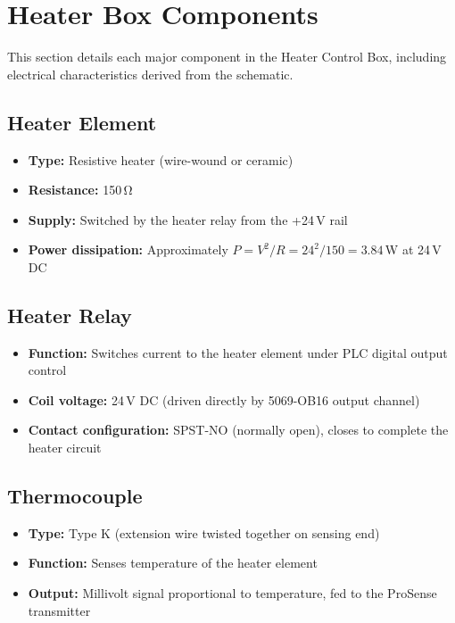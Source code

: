 \documentclass[main.tex]{subfiles}
\begin{document}
\section{Heater Box Components}

This section details each major component in the Heater Control Box, including electrical characteristics derived from the schematic.

\subsection{Heater Element}

\begin{itemize}
    \item \textbf{Type:} Resistive heater (wire-wound or ceramic)
    \item \textbf{Resistance:} 150\,\si{\ohm}
    \item \textbf{Supply:} Switched by the heater relay from the +24\,V rail
    \item \textbf{Power dissipation:} Approximately $P = V^2/R = 24^2/150 = 3.84$\,W at 24\,V DC
\end{itemize}

\subsection{Heater Relay}

\begin{itemize}
    \item \textbf{Function:} Switches current to the heater element under PLC digital output control
    \item \textbf{Coil voltage:} 24\,V DC (driven directly by 5069-OB16 output channel)
    \item \textbf{Contact configuration:} SPST-NO (normally open), closes to complete the heater circuit
\end{itemize}

\subsection{Thermocouple}

\begin{itemize}
    \item \textbf{Type:} Type K (extension wire twisted together on sensing end)
    \item \textbf{Function:} Senses temperature of the heater element
    \item \textbf{Output:} Millivolt signal proportional to temperature, fed to the ProSense transmitter
\end{itemize}
\end{document}
